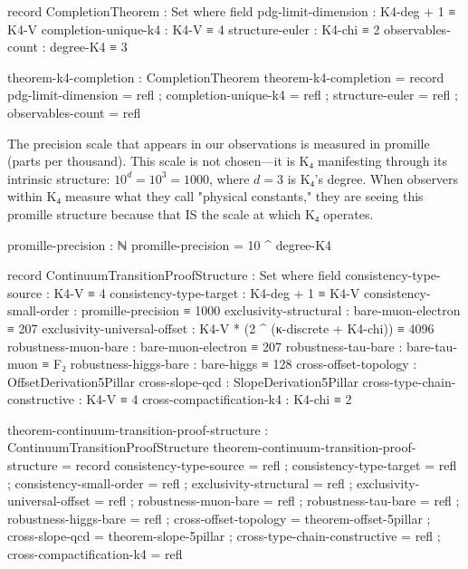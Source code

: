 \documentclass[11pt,a4paper]{book}
\begin{document}
\begin{code}
record CompletionTheorem : Set where
  field
    pdg-limit-dimension : K4-deg + 1 ≡ K4-V
    completion-unique-k4 : K4-V ≡ 4
    structure-euler : K4-chi ≡ 2
    observables-count : degree-K4 ≡ 3

theorem-k4-completion : CompletionTheorem
theorem-k4-completion = record
  { pdg-limit-dimension = refl
  ; completion-unique-k4 = refl
  ; structure-euler = refl
  ; observables-count = refl
  }
\end{code}

The precision scale that appears in our observations is measured in promille (parts per thousand).
This scale is not chosen—it is K₄ manifesting through its intrinsic structure: $10^d = 10^3 = 1000$, where $d = 3$ is K₄'s degree. When observers within K₄ measure what they call "physical constants," they are seeing this promille structure because that IS the scale at which K₄ operates.

\begin{code}
promille-precision : ℕ
promille-precision = 10 ^ degree-K4

record ContinuumTransitionProofStructure : Set where
  field
    consistency-type-source : K4-V ≡ 4
    consistency-type-target : K4-deg + 1 ≡ K4-V
    consistency-small-order : promille-precision ≡ 1000
    exclusivity-structural : bare-muon-electron ≡ 207
    exclusivity-universal-offset : K4-V * (2 ^ (κ-discrete + K4-chi)) ≡ 4096
    robustness-muon-bare : bare-muon-electron ≡ 207
    robustness-tau-bare : bare-tau-muon ≡ F₂
    robustness-higgs-bare : bare-higgs ≡ 128
    cross-offset-topology : OffsetDerivation5Pillar
    cross-slope-qcd : SlopeDerivation5Pillar
    cross-type-chain-constructive : K4-V ≡ 4
    cross-compactification-k4 : K4-chi ≡ 2

theorem-continuum-transition-proof-structure : ContinuumTransitionProofStructure
theorem-continuum-transition-proof-structure = record
  { consistency-type-source = refl
  ; consistency-type-target = refl
  ; consistency-small-order = refl
  ; exclusivity-structural = refl
  ; exclusivity-universal-offset = refl
  ; robustness-muon-bare = refl
  ; robustness-tau-bare = refl
  ; robustness-higgs-bare = refl
  ; cross-offset-topology = theorem-offset-5pillar
  ; cross-slope-qcd = theorem-slope-5pillar
  ; cross-type-chain-constructive = refl
  ; cross-compactification-k4 = refl
  }
\end{code}
\end{document}

